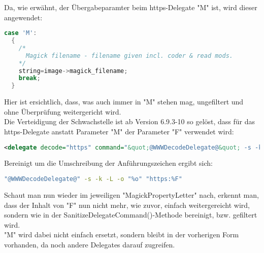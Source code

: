 Da, wie erwähnt, der Übergabeparamter beim https-Delegate "M" ist, wird dieser angewendet:\\

\begin{lstlisting}[firstnumber=2627, language=C, caption=magick/property.c Ungefilterte Weitergabe M-Parameter,label={lst:lstlisting}]
  case 'M':
  {
    /*
      Magick filename - filename given incl. coder & read mods.
    */
    string=image->magick_filename;
    break;
  }
\end{lstlisting}
\vspace{5mm}

Hier ist ersichtlich, dass, was auch immer in "M" stehen mag, ungefiltert und ohne Überprüfung weitergericht wird.\\

Die Verteidigung der Schwachstelle ist ab Version 6.9.3-10 so gelöst, dass für das https-Delegate anstatt Parameter "M" der Parameter "F" verwendet wird:\\

\begin{lstlisting}[firstnumber=91, language=XML, caption=config/delegates.xml.in https-Delegate 6.9.3-10,label={lst:lstlisting}]
  <delegate decode="https" command="&quot;@WWWDecodeDelegate@&quot; -s -k -L -o &quot;%o&quot; &quot;https:%F&quot;"/>
\end{lstlisting}
\vspace{5mm}

Bereinigt um die Umschreibung der Anführungszeichen ergibt sich:\\

\begin{lstlisting}[firstnumber=1, language=Bash, caption=Aufgelöster https-Delegate-Befehl 6.9.3-10,label={lst:lstlisting}]
"@WWWDecodeDelegate@" -s -k -L -o "%o" "https:%F"
\end{lstlisting}
\vspace{5mm}

Schaut man nun wieder im jeweiligen "MagickPropertyLetter" nach, erkennt man, dass der Inhalt von "F" nun nicht mehr, wie zuvor, einfach weitergereicht wird, sondern wie in der SanitizeDelegateCommand()-Methode bereinigt, bzw. gefiltert wird.\\
"M" wird dabei nicht einfach ersetzt, sondern bleibt in der vorherigen Form vorhanden, da noch andere Delegates darauf zugreifen.\\

